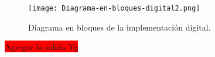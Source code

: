 \begin{figure}[H]
	\centering
	\texttt{[image: Diagrama-en-bloques-digital2.png]}
	\caption{Diagrama en bloques de la implementación digital.}
	\label{fig:diag-en-bloques-digital}
\end{figure}

\colorbox{red}{Agregar la salida Yg}
%


%

